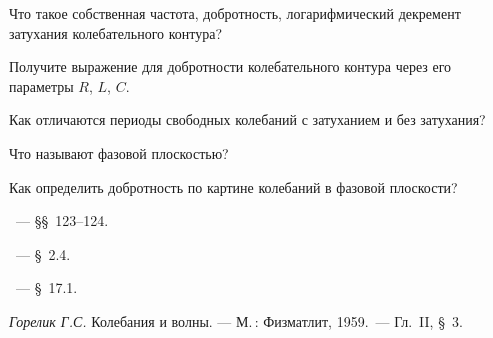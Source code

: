 \begin{lab:questions}
	\item Что такое собственная частота, добротность, логарифмический декремент
затухания колебательного контура?
    \item Получите выражение для добротности колебательного контура через его 
    параметры $R$, $L$, $C$.
    \item Как отличаются периоды свободных колебаний с затуханием и без затухания?
	\item Что называют фазовой плоскостью?
	\item  Как определить добротность по картине колебаний в фазовой плоскости?
\end{lab:questions}


\begin{lab:literature}
	\item \SivuhinIII~--- \S\S~123--124.
	\item \KingLokOlh~--- \S~2.4.
	\item \Kirichenko~--- \S~17.1.
	\item \textit{Горелик Г.С.} Колебания и волны. --- М.\,: Физматлит, 1959.~--- 
	Гл.~II, \S~3.
\end{lab:literature}
